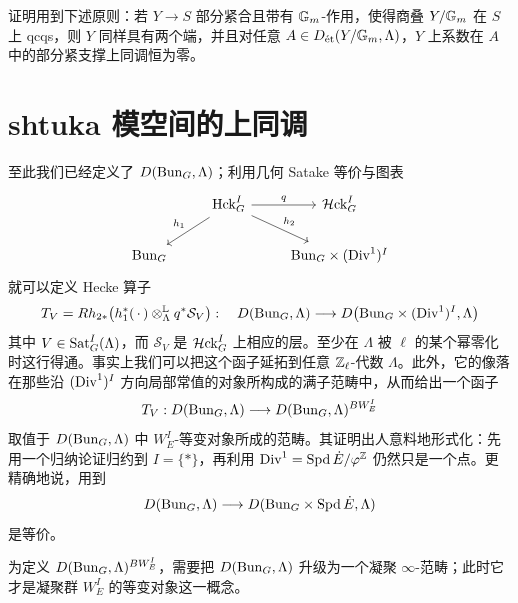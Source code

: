 证明用到下述原则：若 $Y\to S$ 部分紧合且带有 $\mathbb{G}_m$-作用，使得商叠 $Y/\mathbb{G}_m$ 在 $S$ 上 qcqs，则 $Y$ 同样具有两个端，并且对任意 $A\in D_{\text{\'et}}(Y/\mathbb{G}_m,\Lambda)$，$Y$ 上系数在 $A$ 中的部分紧支撑上同调恒为零。

\section{shtuka 模空间的上同调}

至此我们已经定义了 $D(\mathrm{Bun}_G,\Lambda)$；利用几何 Satake 等价与图表
\[
\begin{tikzcd}
& \Hck^I_G \arrow[r,"q"] \arrow[dl,"h_1"'] \arrow[dr,"h_2"] & \fsHck^I_G \\
\Bun_G & & \Bun_G\times(\Div^1)^I
\end{tikzcd}
\]
就可以定义 Hecke 算子
\[
T_V=R h_{2*}\bigl(h_1^*(\,\cdot\,)\otimes^{\mathbb{L}}_\Lambda q^*\mathcal{S}_V\bigr):\quad
D(\mathrm{Bun}_G,\Lambda)\longrightarrow D\bigl(\mathrm{Bun}_G\times(\mathrm{Div}^1)^I,\Lambda\bigr)
\]
其中 $V\in\operatorname{Sat}^I_G(\Lambda)$，而 $\mathcal{S}_V$ 是 $\mathcal{H}\mathrm{ck}^I_G$ 上相应的层。至少在 $\Lambda$ 被 $\ell$ 的某个幂零化时这行得通。事实上我们可以把这个函子延拓到任意 $\mathbb{Z}_\ell$-代数 $\Lambda$。此外，它的像落在那些沿 $(\mathrm{Div}^1)^I$ 方向局部常值的对象所构成的满子范畴中，从而给出一个函子
\[
T_V:D(\mathrm{Bun}_G,\Lambda)\longrightarrow D(\mathrm{Bun}_G,\Lambda)^{BW_E^I}
\]
取值于 $D(\mathrm{Bun}_G,\Lambda)$ 中 $W_E^I$-等变对象所成的范畴。其证明出人意料地形式化：先用一个归纳论证归约到 $I=\{*\}$，再利用 $\mathrm{Div}^1=\operatorname{Spd}\dot E/\varphi^{\mathbb{Z}}$ 仍然只是一个点。更精确地说，用到
\[
D(\mathrm{Bun}_G,\Lambda)\longrightarrow D(\mathrm{Bun}_G\times\operatorname{Spd}\dot E,\Lambda)
\]
是等价。



\begin{remark}%
为定义 $D(\mathrm{Bun}_G,\Lambda)^{BW_E^I}$，需要把 $D(\mathrm{Bun}_G,\Lambda)$ 升级为一个凝聚 $\infty$-范畴；此时它才是凝聚群 $W_E^I$ 的等变对象这一概念。
\end{remark}

